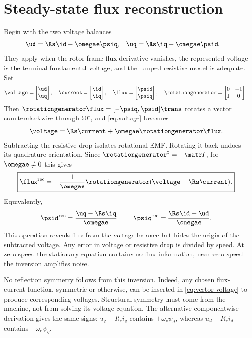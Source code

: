 \section{Steady-state flux reconstruction}
Begin with the two voltage balances
\begin{align}
 \ud&=\Rs\id-\omegae\psiq, &
 \uq&=\Rs\iq+\omegae\psid.\label{eq:voltage}
\end{align}
They apply when the rotor-frame flux derivative vanishes, the represented
voltage is the terminal fundamental voltage, and the lumped resistive model
is adequate. Set
\begin{equation}
 \voltage=\begin{bmatrix}\ud\\\uq\end{bmatrix},\quad
 \current=\begin{bmatrix}\id\\\iq\end{bmatrix},\quad
 \flux=\begin{bmatrix}\psid\\\psiq\end{bmatrix},\quad
 \rotationgenerator=\begin{bmatrix}0&-1\\1&0\end{bmatrix}.
\end{equation}
Then $\rotationgenerator\flux=[-\psiq,\psid]\trans$ rotates a vector counterclockwise
through $90^\circ$, and \cref{eq:voltage} becomes
\begin{equation}
 \voltage=\Rs\current+\omegae\rotationgenerator\flux.\label{eq:vector-voltage}
\end{equation}
Subtracting the resistive drop isolates rotational EMF. Rotating it back
undoes its quadrature orientation. Since $\rotationgenerator^2=-\matr I$, for
$\omegae\ne0$ this gives
\begin{equation}
 \boxed{\flux^{\rm rec}=-\frac{1}{\omegae}\rotationgenerator
 (\voltage-\Rs\current).}\label{eq:reconstruction}
\end{equation}
Equivalently,
\begin{equation}
 \psid^{\rm rec}=\frac{\uq-\Rs\iq}{\omegae},\qquad
 \psiq^{\rm rec}=\frac{\Rs\id-\ud}{\omegae}.
\end{equation}
This operation reveals flux from the voltage balance but hides the origin of
the subtracted voltage. Any error in voltage or resistive drop is divided by
speed. At zero speed the stationary equation contains no flux information;
near zero speed the inversion amplifies noise.

No reflection symmetry follows from this inversion. Indeed, any chosen
flux-current function, symmetric or otherwise, can be inserted in
\cref{eq:vector-voltage} to produce corresponding voltages. Structural
symmetry must come from the machine, not from solving its voltage equation.
The alternative componentwise derivation gives the same signs: $u_q-R_si_q$
contains $+\omega_e\psi_d$, whereas $u_d-R_si_d$ contains
$-\omega_e\psi_q$.
